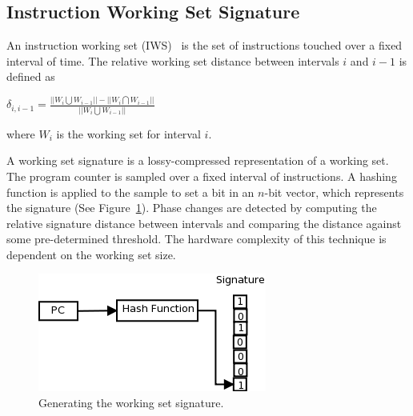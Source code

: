 \subsection{Instruction Working Set Signature}

An instruction working set (IWS)~\cite{Dhodapkar:2002:MMH} is the set of instructions touched over a fixed interval of time. The relative working set distance between intervals $i$ and $i-1$ is defined as 

\begin{center}
$\delta_{i,i-1} = \frac{||W_i \bigcup W_{i-1}||-||W_i \bigcap W_{i-1}||}{||W_i \bigcup W_{i-1}||}$
\end{center}
where $W_i$ is the working set for interval $i$.
 
A working set signature is a lossy-compressed representation of a working set. The program counter is sampled over a fixed interval of instructions. A hashing function is applied to the sample to set a bit in an $n$-bit vector, which represents the signature (See Figure~\ref{fig:signature}). Phase changes are detected by computing the relative signature distance between intervals and comparing the distance against some pre-determined threshold. The hardware complexity of this technique is dependent on the working set size.

\begin{figure}[htbp]
  \begin{center}
\includegraphics[width=0.60\columnwidth]{figs/workingsetsignature}
  \end{center}
  \caption{Generating the working set signature.}
  \label{fig:signature}
\end{figure}
